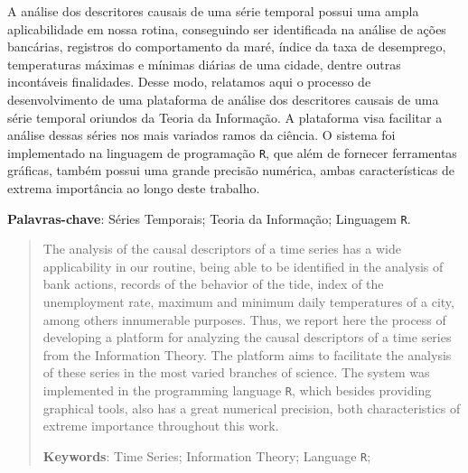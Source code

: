 \documentclass[tcc]{ic}
\begin{document}
\begin{resumo}

A análise dos descritores causais de uma série temporal possui uma ampla aplicabilidade em nossa rotina, conseguindo ser identificada na análise de ações bancárias, registros do comportamento da maré, índice da taxa de desemprego, temperaturas máximas e mínimas diárias de uma cidade, dentre outras incontáveis finalidades. 
Desse modo, relatamos aqui o processo de desenvolvimento de uma plataforma de análise dos descritores causais de uma série temporal oriundos da Teoria da Informação.
 	A plataforma visa facilitar a análise dessas séries nos mais variados ramos da ciência. 
 	O sistema foi implementado na linguagem de programação \texttt R, que além de fornecer ferramentas gráficas, também possui uma grande precisão numérica, ambas características de extrema importância ao longo deste trabalho.

\vspace{2em}
\textbf{Palavras-chave}: Séries Temporais; Teoria da Informação; Linguagem \texttt R.

\end{resumo}

\begin{abstract}

The analysis of the causal descriptors of a time series has a wide applicability in our routine, being able to be identified in the analysis of bank actions, records of the behavior of the tide, index of the unemployment rate, maximum and minimum daily temperatures of a city, among others innumerable purposes.
Thus, we report here the process of developing a platform for analyzing the causal descriptors of a time series from the Information Theory.
The platform aims to facilitate the analysis of these series in the most varied branches of science.
The system was implemented in the programming language \texttt R, which besides providing graphical tools, also has a great numerical precision, both characteristics of extreme importance throughout this work.

\vspace{2em}
\textbf{Keywords}: Time Series; Information Theory; Language \texttt R;

\end{abstract}


\tableofcontents

\listoffigures
{}
\end{document}

